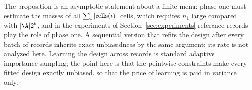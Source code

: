 The proposition is an asymptotic statement about a finite menu: phase one
must estimate the masses of all $\sum_\iota|{\rm cells}(\iota)|$ cells, which
requires $n_1$ large compared with $|\A|2^b$, and in the experiments of
Section~\ref{sec:experiments} reference records play the role of phase one.
A sequential version that refits the design after every batch of records
inherits exact unbiasedness by the same argument; its rate is not analyzed
here. Learning the design across records is standard adaptive importance
sampling; the point here is that the pointwise constraints make every fitted
design exactly unbiased, so that the price of learning is paid in variance
only.

